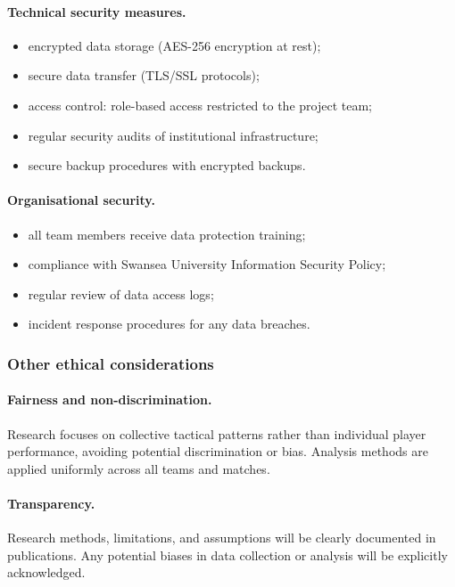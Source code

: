 \paragraph{Technical security measures.}
\begin{itemize}
  \item encrypted data storage (AES-256 encryption at rest);
  \item secure data transfer (TLS/SSL protocols);
  \item access control: role-based access restricted to the project team;
  \item regular security audits of institutional infrastructure;
  \item secure backup procedures with encrypted backups.
\end{itemize}

\paragraph{Organisational security.}
\begin{itemize}
  \item all team members receive data protection training;
  \item compliance with Swansea University Information Security Policy;
  \item regular review of data access logs;
  \item incident response procedures for any data breaches.
\end{itemize}

\subsubsection{Other ethical considerations}

\paragraph{Fairness and non-discrimination.}
Research focuses on collective tactical patterns rather than individual player performance, avoiding potential discrimination or bias. Analysis methods are applied uniformly across all teams and matches.

\paragraph{Transparency.}
Research methods, limitations, and assumptions will be clearly documented in publications. Any potential biases in data collection or analysis will be explicitly acknowledged.

